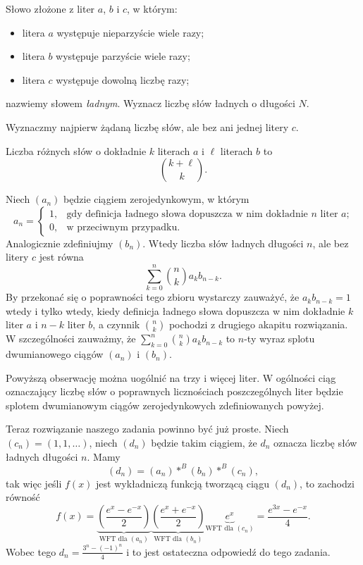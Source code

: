 \documentclass[shortabstract]{imthesis}
\begin{document}
\begin{problem}
    Słowo złożone z liter $a$, $b$ i $c$, w którym:
    \begin{itemize}
        \item litera $a$ występuje nieparzyście wiele razy;
        \item litera $b$ występuje parzyście wiele razy;
        \item litera $c$ występuje dowolną liczbę razy;
    \end{itemize}
    nazwiemy słowem \emph{ładnym}. Wyznacz liczbę słów ładnych o długości $N$.
\end{problem}
\begin{solution}
    Wyznaczmy najpierw żądaną liczbę słów, ale bez ani jednej litery $c$. 
    
    Liczba różnych słów o dokładnie $k$ literach $a$ i $\ell$ literach $b$ to
    $$
    {k+\ell \choose k}.
    $$

    Niech $(a_n)$ będzie ciągiem zerojedynkowym, w którym
    $$
    a_n = \begin{cases} 1, &\text{gdy definicja ładnego słowa dopuszcza w nim dokładnie $n$ liter $a$;} \\ 0, &\text{w przeciwnym przypadku.} \end{cases}
    $$
    Analogicznie zdefiniujmy $(b_n)$. Wtedy liczba słów ładnych długości $n$, ale bez litery $c$ jest równa
    $$
    \sum_{k=0}^n {n \choose k} a_kb_{n-k}.
    $$
    By przekonać się o poprawności tego zbioru wystarczy zauważyć, że $a_kb_{n-k} = 1$ wtedy i tylko wtedy, kiedy definicja ładnego słowa dopuszcza w nim dokładnie $k$ liter $a$ i $n-k$ liter $b$, a czynnik ${n \choose k}$ pochodzi z drugiego akapitu rozwiązania. W szczególności zauważmy, że $\sum_{k=0}^n {n \choose k} a_kb_{n-k}$ to $n$-ty wyraz splotu dwumianowego ciągów $(a_n)$ i $(b_n)$.

    Powyższą obserwację można uogólnić na trzy i więcej liter. W ogólności ciąg oznaczający liczbę słów o poprawnych licznościach poszczególnych liter będzie splotem dwumianowym ciągów zerojedynkowych zdefiniowanych powyżej.

    Teraz rozwiązanie naszego zadania powinno być już proste. Niech $(c_n) = (1, 1, \ldots)$, niech $(d_n)$ będzie takim ciągiem, że $d_n$ oznacza liczbę słów ładnych długości $n$. Mamy
    $$
    (d_n) = (a_n) *^B (b_n) *^B (c_n),
    $$
    tak więc jeśli $f(x)$ jest wykładniczą funkcją tworzącą ciągu $(d_n)$, to zachodzi równość
    $$
    f(x) = \underbrace{\left(\frac{e^x - e^{-x}}{2}\right)}_{\text{WFT dla $(a_n)$}}\underbrace{\left(\frac{e^x + e^{-x}}{2}\right)}_{\text{WFT dla $(b_n)$}} \underbrace{e^x}_{\text{WFT dla $(c_n)$}} = \frac{e^{3x}-e^{-x}}{4}.  
    $$
    Wobec tego $d_n = \frac{3^n - (-1)^n}{4}$ i to jest ostateczna odpowiedź do tego zadania.
\end{solution}
\end{document}
